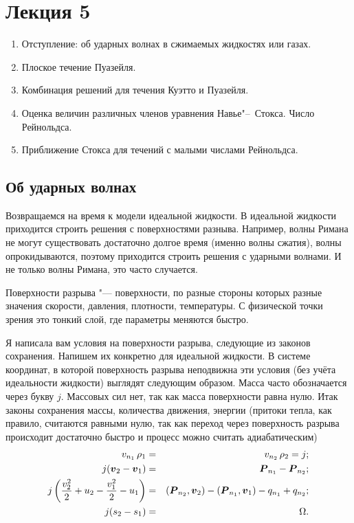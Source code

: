 \section{Лекция 5}
\begin{enumerate}
	\item Отступление: об ударных волнах в сжимаемых жидкостях или газах.
	\item Плоское течение Пуазейля.
	\item Комбинация решений для течения Куэтто и Пуазейля.
	\item Оценка величин различных членов уравнения Навье"--~Стокса. Число Рейнольдса.
	\item Приближение Стокса для течений с малыми числами Рейнольдса.
\end{enumerate}
\subsection{Об ударных волнах}
Возвращаемся на время к модели идеальной жидкости. В идеальной жидкости приходится строить решения с поверхностями разныва. Например, волны Римана не могут существовать достаточно долгое время (именно волны сжатия), волны опрокидываются, поэтому приходится строить решения с ударными волнами. И не только волны Римана, это часто случается.

Поверхности разрыва "--- поверхности, по разные стороны которых разные значения скорости, давления, плотности, температуры. С физической точки зрения это тонкий слой, где параметры меняются быстро. 

Я написала вам условия на поверхности разрыва, следующие из законов сохранения. Напишем их конкретно для идеальной жидкости. В системе координат, в которой поверхность разрыва неподвижна эти условия (без учёта идеальности жидкости) выглядят следующим образом. Масса часто обозначается через букву $j$. Массовых сил нет, так как масса поверхности равна нулю. Итак законы сохранения массы, количества движения, энергии (притоки тепла, как правило, считаются равными нулю, так как переход через поверхность разрыва происходит достаточно быстро и процесс можно считать адиабатическим)
\begin{eqnarray*}
	v_{n_1}\,\rho_1 &=& v_{n_2}\,\rho_2 = j;\\
	j(\boldsymbol{v}_2-\boldsymbol{v}_1)&=&\boldsymbol{P}_{n_1} - \boldsymbol{P}_{n_2};\\
	j\left(\frac{v_2^2}2 + u_2 - \frac{v_1^2}2 - u_1\right) &=&
	  (\boldsymbol{P}_{n_2},\boldsymbol{v}_2)
	  - (\boldsymbol{P}_{n_1},\boldsymbol{v}_1)
	  -q_{n_1} + q_{n_2};\\
	j(s_2-s_1) &=& \Omega.
\end{eqnarray*}

